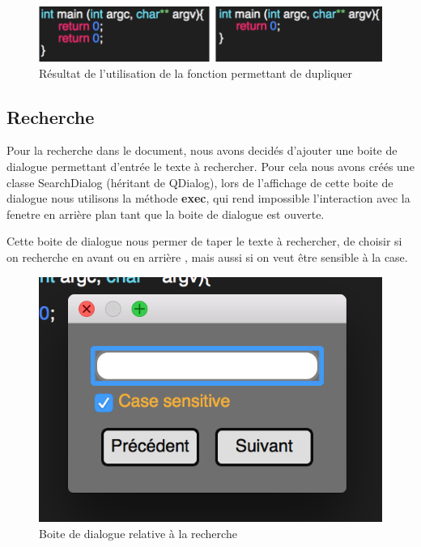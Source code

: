 \documentclass[a4paper,12pt]{article}
\begin{document}
	\begin{figure}[h!]
		\begin{center}
			\includegraphics[scale=0.8]{images/imgs_edit/resultat_duplication}
			\caption{Résultat de l'utilisation de la fonction permettant de dupliquer}
		\end{center}
	\end{figure}

	\newpage
\subsection{Recherche}

	Pour la recherche dans le document, nous avons decidés d'ajouter une boite de dialogue permettant d'entrée le texte à rechercher. Pour cela nous avons créés une classe SearchDialog (héritant de QDialog), lors de l'affichage de cette boite de dialogue nous utilisons la méthode \textbf{exec}, qui rend impossible l'interaction avec la fenetre en arrière plan tant que la boite de dialogue est ouverte.

	Cette boite de dialogue nous permer de taper le texte à rechercher, de choisir si on recherche en avant ou en arrière , mais aussi si on veut être sensible à la case.

	\begin{figure}[h!]
		\begin{center}
			\includegraphics[scale=0.8]{images/imgs_edit/boite_dialog_recherche}
			\caption{Boite de dialogue relative à la recherche}
		\end{center}
	\end{figure}
\end{document}
